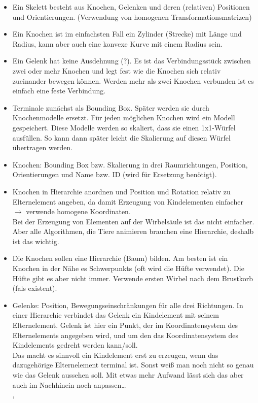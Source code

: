 \begin{itemize}
 \item Ein Skelett besteht aus Knochen, Gelenken und deren (relativen) Positionen und Orientierungen. (Verwendung von homogenen Transformationsmatrizen)
 
 \item Ein Knochen ist im einfachsten Fall ein Zylinder (Strecke) mit Länge und Radius, kann aber auch eine konvexe Kurve mit einem Radius sein.
 
 \item Ein Gelenk hat keine Ausdehnung (?). Es ist das Verbindungsstück zwischen zwei oder mehr Knochen und legt fest wie die Knochen sich relativ zueinander bewegen können. Werden mehr als zwei Knochen verbunden ist es einfach eine feste Verbindung.
 
 \item Terminale zunächst als Bounding Box. Später werden sie durch Knochenmodelle ersetzt. Für jeden möglichen Knochen wird ein Modell gespeichert. Diese Modelle werden so skaliert, dass sie einen 1x1-Würfel ausfüllen. So kann dann später leicht die Skalierung auf diesen Würfel übertragen werden.
 
 \item Knochen: Bounding Box bzw. Skalierung in drei Raumrichtungen, Position, Orientierungen und Name bzw. ID (wird für Ersetzung benötigt).
 
 \item Knochen in Hierarchie anordnen und Position und Rotation relativ zu Elternelement angeben, da damit Erzeugung von Kindelementen einfacher $\rightarrow$ verwende homogene Koordinaten.\\
 Bei der Erzeugung von Elementen auf der Wirbelsäule ist das nicht einfacher. Aber alle Algorithmen, die Tiere animieren brauchen eine Hierarchie, deshalb ist das wichtig. 
 
 \item Die Knochen sollen eine Hierarchie (Baum) bilden. Am besten ist ein Knochen in der Nähe es Schwerpunkts (oft wird die Hüfte verwendet). Die Hüfte gibt es aber nicht immer. Verwende ersten Wirbel nach dem Brustkorb (fals existent).
 
 \item Gelenke: Position, Bewegungseinschränkungen für alle drei Richtungen. In einer Hierarchie verbindet das Gelenk ein Kindelement mit seinem Elternelement. Gelenk ist hier ein Punkt, der im Koordinatensystem des Elternelements angegeben wird, und um den das Koordinatensystem des Kindelements gedreht werden kann/soll.\\
 Das macht es sinnvoll ein Kindelement erst zu erzeugen, wenn das dazugehörige Elternelement terminal ist. Sonst weiß man noch nicht so genau wie das Gelenk aussehen soll. Mit etwas mehr Aufwand lässt sich das aber auch im Nachhinein noch anpassen\dots\\
 , %
 

\end{itemize}
